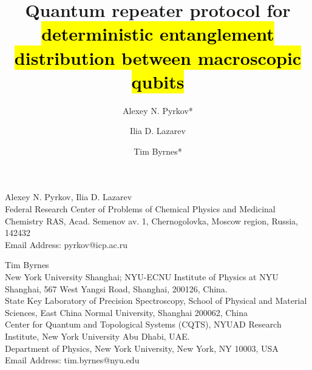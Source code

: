 \documentclass{WileyMSP-template}
\begin{document}
\pagestyle{fancy}


\title{Quantum repeater protocol for \hl{deterministic entanglement distribution between macroscopic qubits}}

\maketitle

\author{Alexey N. Pyrkov*}
\author{Ilia D. Lazarev}
\author{Tim Byrnes*}

\begin{affiliations}
Alexey N. Pyrkov, Ilia D. Lazarev\\
Federal Research Center of Problems of Chemical Physics and Medicinal Chemistry RAS, Acad. Semenov av. 1, Chernogolovka, Moscow region, Russia, 142432\\
Email Address: pyrkov@icp.ac.ru

Tim Byrnes\\
New York University Shanghai; NYU-ECNU Institute of Physics at NYU Shanghai, 567 West Yangsi Road, Shanghai, 200126, China.\\
State Key Laboratory of Precision Spectroscopy, School of Physical and Material Sciences, East China Normal University, Shanghai 200062, China\\
Center for Quantum and Topological Systems (CQTS), NYUAD Research Institute, New York University Abu Dhabi, UAE.\\
Department of Physics, New York University, New York, NY 10003, USA\\
Email Address: tim.byrnes@nyu.edu
\end{affiliations}

\end{document}
